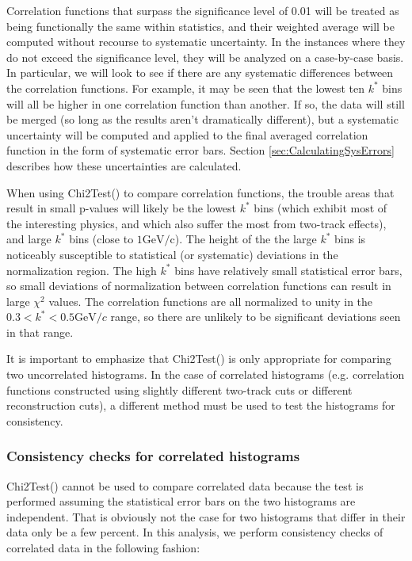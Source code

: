 Correlation functions that surpass the significance level of 0.01 will be treated as being functionally the same within statistics, and their weighted average will be computed without recourse to systematic uncertainty. 
In the instances where they do not exceed the significance level, they will be analyzed on a case-by-case basis.  
In particular, we will look to see if there are any systematic differences between the correlation functions.  
For example, it may be seen that the lowest ten $k^*$ bins will all be higher in one correlation function than another.  
If so, the data will still be merged (so long as the results aren't dramatically different), but a systematic uncertainty will be computed and applied to the final averaged correlation function in the form of systematic error bars.  
Section \ref{sec:CalculatingSysErrors} describes how these uncertainties are calculated.  

When using Chi2Test() to compare correlation functions, the trouble areas that result in small p-values will likely be the lowest $k^*$ bins (which exhibit most of the interesting physics, and which also suffer the most from two-track effects), and large $k^*$ bins (close to $1 \mathrm{GeV/c}$).  
The height of the the large $k^*$ bins is noticeably susceptible to statistical (or systematic) deviations in the normalization region.  
The high $k^*$ bins have relatively small statistical error bars, so small deviations of normalization between correlation functions can result in large $\chi^2$ values.  
The correlation functions are all normalized to unity in the $0.3 < k^* < 0.5 \mathrm{GeV}/c$ range, so there are unlikely to be significant deviations seen in that range.  

It is important to emphasize that Chi2Test() is only appropriate for comparing two uncorrelated histograms.  
In the case of correlated histograms (e.g. correlation functions constructed using slightly different two-track cuts or different reconstruction cuts), a different method must be used to test the histograms for consistency.  


\subsubsection{Consistency checks for correlated histograms}
\label{sec:ConsistencyCheckCorrelated}
Chi2Test() cannot be used to compare correlated data because the test is performed assuming the statistical error bars on the two histograms are independent.  
That is obviously not the case for two histograms that differ in their data only be a few percent.  
In this analysis, we perform consistency checks of correlated data in the following fashion:

